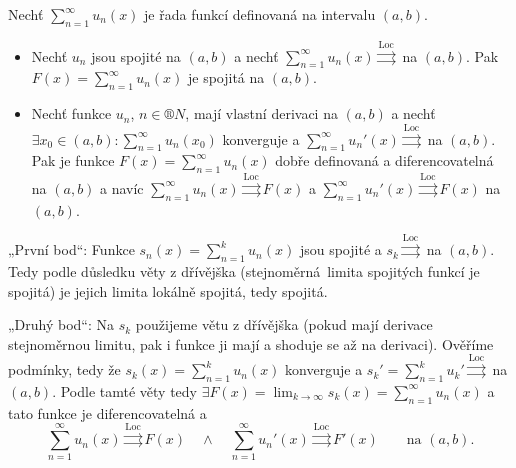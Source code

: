 \documentclass[12pt]{article}					%
\begin{document}
	\begin{veta}
		Nechť $\sum_{n=1}^∞ u_n(x)$ je řada funkcí definovaná na intervalu $(a, b)$.

		\begin{itemize}
			\item Nechť $u_n$ jsou spojité na $(a, b)$ a nechť $\sum_{n=1}^∞ u_n(x) \overset{\text{Loc}}{\rightrightarrows}$ na $(a, b)$. Pak $F(x) = \sum_{n=1}^∞ u_n(x)$ je spojitá na $(a, b)$.
			\item Nechť funkce $u_n$, $n \in ®N$, mají vlastní derivaci na $(a, b)$ a nechť $\exists x_0 \in (a, b): \sum_{n=1}^∞ u_n(x_0)$ konverguje a $\sum_{n=1}^∞ u_n'(x) \overset{\text{Loc}}{\rightrightarrows}$ na $(a, b)$. Pak je funkce $F(x) = \sum_{n=1}^∞ u_n(x)$ dobře definovaná a diferencovatelná na $(a, b)$ a navíc $\sum_{n=1}^∞ u_n(x) \overset{\text{Loc}}{\rightrightarrows} F(x)$ a $\sum_{n=1}^∞ u_n'(x) \overset{\text{Loc}}{\rightrightarrows} F(x)$ na $(a, b)$.
		\end{itemize}

		\begin{dukazin}
			„První bod“: Funkce $s_n(x) = \sum_{n=1}^k u_n(x)$ jsou spojité a $s_k \overset{\text{Loc}}{\rightrightarrows}$ na $(a, b)$. Tedy podle důsledku věty z dřívějška (stejnoměrná limita spojitých funkcí je spojitá) je jejich limita lokálně spojitá, tedy spojitá.

			„Druhý bod“: Na $s_k$ použijeme větu z dřívějška (pokud mají derivace stejnoměrnou limitu, pak i funkce ji mají a shoduje se až na derivaci). Ověříme podmínky, tedy že $s_k(x) = \sum_{n=1}^k u_n(x)$ konverguje a $s_k' = \sum_{n=1}^k u_k' \overset{\text{Loc}}{\rightrightarrows}$ na $(a, b)$. Podle tamté věty tedy $\exists F(x) = \lim_{k \rightarrow ∞} s_k(x) = \sum_{n=1}^∞ u_n(x)$ a tato funkce je diferencovatelná a
			$$ \sum_{n=1}^∞ u_n(x) \overset{\text{Loc}}{\rightrightarrows} F(x) \quad \land \quad \sum_{n=1}^∞ u_n'(x) \overset{\text{Loc}}{\rightrightarrows} F'(x) \qquad \text{na } (a, b). $$
		\end{dukazin}
	\end{veta}
\end{document}
